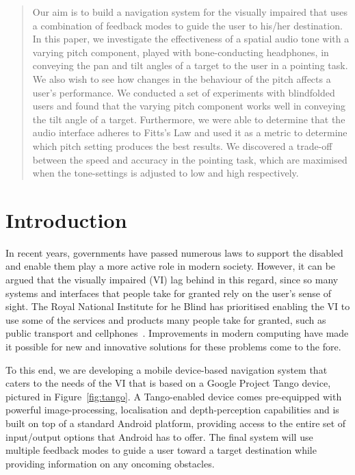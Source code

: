 \documentclass[format=sigconf, review=true, screen=true, anonymous=true]{acmart}
\begin{document}

\begin{abstract}
	Our aim is to build a navigation system for the visually impaired that uses a combination of feedback modes to guide the user to his/her destination. In this paper, we investigate the effectiveness of a spatial audio tone with a varying pitch component, played with bone-conducting headphones, in conveying the pan and tilt angles of a target to the user in a pointing task. We also wish to see how changes in the behaviour of the pitch affects a user's performance. We conducted a set of experiments with blindfolded users and found that the varying pitch component works well in conveying the tilt angle of a target. Furthermore, we were able to determine that the audio interface adheres to Fitts's Law and used it as a metric to determine which pitch setting produces the best results. We discovered a trade-off between the speed and accuracy in the pointing task, which are maximised when the tone-settings is adjusted to low and high respectively. 
\end{abstract}

\maketitle

\section{Introduction}

In recent years, governments have passed numerous laws to support the disabled and enable them play a more active role in modern society. However, it can be argued that the visually impaired (VI) lag behind in this regard, since so many systems and interfaces that people take for granted rely on the user's sense of sight. The Royal National Institute for he Blind has prioritised enabling the VI to use some of the services and products many people take for granted, such as public transport and cellphones~\cite{rnib-objectives}. Improvements in modern computing have made it possible for new and innovative solutions for these problems come to the fore.

To this end, we are developing a mobile device-based navigation system that caters to the needs of the VI that is based on a Google Project Tango device, pictured in Figure~\ref{fig:tango}. A Tango-enabled device comes pre-equipped with powerful image-processing, localisation and depth-perception capabilities and is built on top of a standard Android platform, providing access to the entire set of input/output options that Android has to offer. The final system will use multiple feedback modes to guide a user toward a target destination while providing information on any oncoming obstacles.
\end{document}
